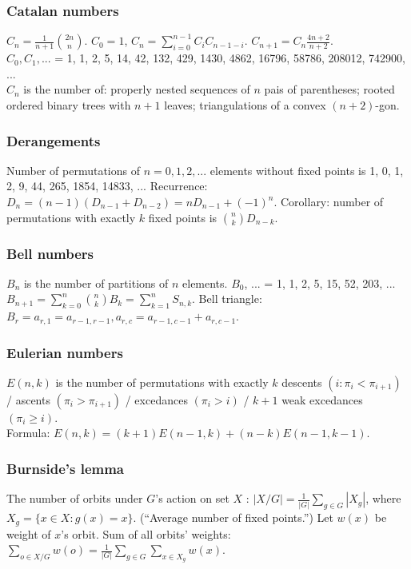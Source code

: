 \documentclass[a4paper,12pt]{article}
\begin{document}
\subsubsection{Catalan numbers}
$C_{n} = \frac{1}{n+1}\binom{2n}{n}$. $C_0 = 1$,  $C_{n} = \sum_{i=0}^{n-1}C_iC_{n-1-i}$. $C_{n+1} = C_{n}\frac{4n+2}{n+2}$.\\
$C_0,C_1,... $ = 1, 1, 2, 5, 14, 42, 132, 429, 1430, 4862, 16796, 58786, 208012, 742900, ...\\
$C_{n}$ is the number of: properly nested sequences of $n$ pais of parentheses; rooted ordered binary trees with $n+1$ leaves; triangulations of a convex $(n+2)$-gon.

\subsubsection{Derangements}
Number of permutations of $n = 0,1,2,...$ elements without fixed points is 1, 0, 1, 2, 9, 44, 265, 1854, 14833, ... Recurrence: $D_{n} = (n-1)(D_{n-1} + D_{n-2}) = nD_{n-1} + (-1)^{n}$.
Corollary: number of permutations with exactly $k$ fixed points is $\binom{n}{k}D_{n-k}$.

\subsubsection{Bell numbers}
$B_{n}$ is the number of partitions of $n$ elements. $B_0$, ... = 1, 1, 2, 5, 15, 52, 203, ...\\
$B_{n+1} = \sum_{k=0}^{n}\binom{n}{k}B_{k} = \sum_{k=1}^{n} S_{n,k}$. Bell triangle: $B_r = a_{r,1} = a_{r-1,r-1}, a_{r,c} = a_{r-1,c-1} + a_{r,c-1}$.

\subsubsection{Eulerian numbers}
$E(n, k)$ is the number of permutations with exactly $k$ descents $(i : \pi_{i} < \pi_{i+1})$ / ascents $(\pi_{i} > \pi_{i+1})$ / excedances $(\pi_{i} > i)$ / $k + 1$ weak excedances $(\pi_{i} \geq i)$.\\
Formula: $E(n,k) = (k+1)E(n-1,k) + (n-k)E(n-1,k-1)$.

\subsubsection{Burnside's lemma}
The number of orbits under $G$'s action on set $X$ : $|X/G| = \frac{1}{|G|} \sum_{g \in G} |X_g|$, where $X_g = \{x \in X : g(x) = x\}$. (``Average number of fixed points.'')
Let $w(x)$ be weight of $x$'s orbit. Sum of all orbits' weights: $\sum_{o \in X/G}w(o) = \frac{1}{|G|} \sum_{g \in G} \sum_{x \in X_g} w(x)$.
\end{document}
